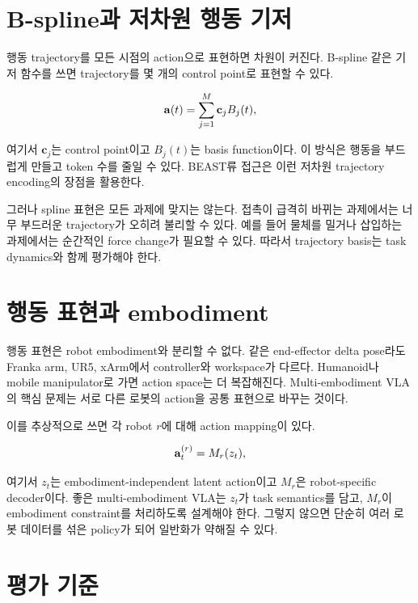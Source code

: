 \section{B-spline과 저차원 행동 기저}

행동 trajectory를 모든 시점의 action으로 표현하면 차원이 커진다. B-spline 같은 기저 함수를 쓰면 trajectory를 몇 개의 control point로 표현할 수 있다.

\begin{equation}
  \mathbf{a}(t)
  =
  \sum_{j=1}^{M}
  \mathbf{c}_j B_j(t),
\end{equation}

여기서 $\mathbf{c}_j$는 control point이고 $B_j(t)$는 basis function이다. 이 방식은 행동을 부드럽게 만들고 token 수를 줄일 수 있다. BEAST류 접근은 이런 저차원 trajectory encoding의 장점을 활용한다.

그러나 spline 표현은 모든 과제에 맞지는 않는다. 접촉이 급격히 바뀌는 과제에서는 너무 부드러운 trajectory가 오히려 불리할 수 있다. 예를 들어 물체를 밀거나 삽입하는 과제에서는 순간적인 force change가 필요할 수 있다. 따라서 trajectory basis는 task dynamics와 함께 평가해야 한다.

\section{행동 표현과 embodiment}

행동 표현은 robot embodiment와 분리할 수 없다. 같은 end-effector delta pose라도 Franka arm, UR5, xArm에서 controller와 workspace가 다르다. Humanoid나 mobile manipulator로 가면 action space는 더 복잡해진다. Multi-embodiment VLA의 핵심 문제는 서로 다른 로봇의 action을 공통 표현으로 바꾸는 것이다.

이를 추상적으로 쓰면 각 robot $r$에 대해 action mapping이 있다.

\begin{equation}
  \mathbf{a}_t^{(r)}
  =
  M_r(z_t),
\end{equation}

여기서 $z_t$는 embodiment-independent latent action이고 $M_r$은 robot-specific decoder이다. 좋은 multi-embodiment VLA는 $z_t$가 task semantics를 담고, $M_r$이 embodiment constraint를 처리하도록 설계해야 한다. 그렇지 않으면 단순히 여러 로봇 데이터를 섞은 policy가 되어 일반화가 약해질 수 있다.

\section{평가 기준}

